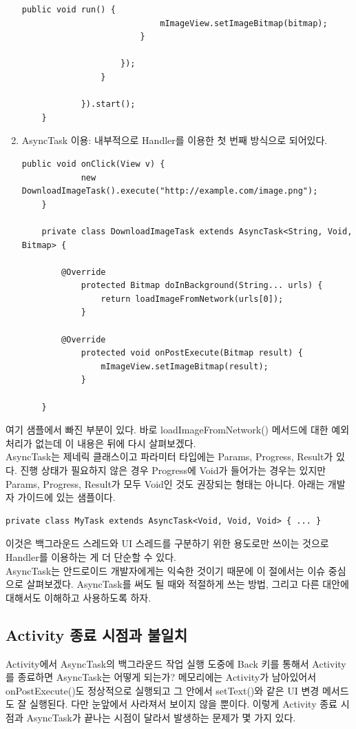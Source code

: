 \begin{enumerate}
\begin{lstlisting}[frame=single]
                		public void run() {
                    		mImageView.setImageBitmap(bitmap);
                		}
                		
            		});
        		}
        	
    		}).start();
	}
\end{lstlisting}
	
\item AsyncTask 이용: 내부적으로 Handler를 이용한 첫 번째 방식으로 되어있다.
\begin{lstlisting}[frame=single]
	public void onClick(View v) {
    		new DownloadImageTask().execute("http://example.com/image.png");
	}

	private class DownloadImageTask extends AsyncTask<String, Void, Bitmap> {
	
		@Override
    		protected Bitmap doInBackground(String... urls) {
        		return loadImageFromNetwork(urls[0]);
    		}

      	@Override
    		protected void onPostExecute(Bitmap result) {
        		mImageView.setImageBitmap(result);
    		}
    	
	}	
\end{lstlisting}
\end{enumerate}
여기 샘플에서 빠진 부분이 있다. 바로 loadImageFromNetwork() 메서드에 대한 예외 처리가 없는데 이 내용은 뒤에 다시 살펴보겠다.\\

AsyncTask는 제네릭 클래스이고 파라미터 타입에는 Params, Progress, Result가 있다. 
진행 상태가 필요하지 않은 경우 Progress에 Void가 들어가는 경우는 있지만 Params, Progress, Result가 모두 Void인 것도 권장되는 형태는 아니다.
아래는 개발자 가이드에 있는 샘플이다.
\begin{lstlisting}[frame=single]
private class MyTask extends AsyncTask<Void, Void, Void> { ... }
\end{lstlisting}
이것은 백그라운드 스레드와 UI 스레드를 구분하기 위한 용도로만 쓰이는 것으로 Handler를 이용하는 게 더 단순할 수 있다.\\

AsyncTask는 안드로이드 개발자에게는 익숙한 것이기 때문에 이 절에서는 이슈 중심으로 살펴보겠다.
AsyncTask를 써도 될 때와 적절하게 쓰는 방법, 그리고 다른 대안에 대해서도 이해하고 사용하도록 하자.

\subsection{Activity 종료 시점과 불일치}
Activity에서 AsyncTask의 백그라운드 작업 실행 도중에 Back 키를 통해서 Activity를 종료하면 AsyncTask는 어떻게 되는가? 
메모리에는 Activity가 남아있어서 onPostExecute()도 정상적으로 실행되고 그 안에서 setText()와 같은 UI 변경 메서드도 잘 실행된다. 다만 눈앞에서 사라져서 보이지 않을 뿐이다.
이렇게 Activity 종료 시점과 AsyncTask가 끝나는 시점이 달라서 발생하는 문제가 몇 가지 있다.

